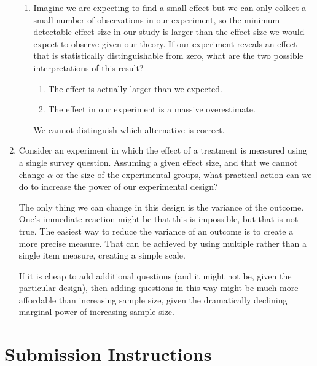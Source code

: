 \documentclass[a4paper]{exam}
\begin{document}
\begin{enumerate}
\begin{enumerate}
	\item Imagine we are expecting to find a small effect but we can only collect a small number of observations in our experiment, so the minimum detectable effect size in our study is larger than the effect size we would expect to observe given our theory. If our experiment reveals an effect that is statistically distinguishable from zero, what are the two possible interpretations of this result?
	
	\begin{solution}
	
	\begin{enumerate}
	\item The effect is actually larger than we expected.
	\item The effect in our experiment is a massive overestimate.
	\end{enumerate}
	
	We cannot distinguish which alternative is correct.
	
	\end{solution}
	
	\end{enumerate}

\item Consider an experiment in which the effect of a treatment is measured using a single survey question. Assuming a given effect size, and that we cannot change $\alpha$ or the size of the experimental groups, what practical action can we do to increase the power of our experimental design?

\begin{solution}

The only thing we can change in this design is the variance of the outcome. One's immediate reaction might be that this is impossible, but that is not true. The easiest way to reduce the variance of an outcome is to create a more precise measure. That can be achieved by using multiple rather than a single item measure, creating a simple scale.

If it is cheap to add additional questions (and it might not be, given the particular design), then adding questions in this way might be much more affordable than increasing sample size, given the dramatically declining marginal power of increasing sample size.

\end{solution}

\end{enumerate}

\section{Submission Instructions}\label{submission-instructions}
\end{document}
